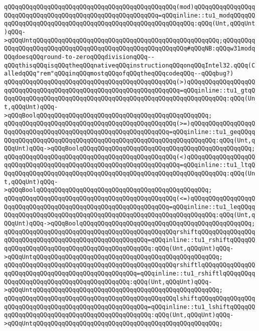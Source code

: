 \verb|qQQqqQQqqQQqqQQqqQQqqQQqqQQqqQQqqQQqqQQqqQQqqQQq(mod)qQQqqQQqqQQqqQQqqQQqqQQqqQQqqQQqqQQqqQQqqQQqqQQqqQQqqQQqqQQq=qQQqinline::tu1_modqQQqqQQqqQQqqQQqqQQqqQQqqQQqqQQqqQQqqQQqqQQqqQQqqQQqqQQqqQQq:qQQq(Unt,qQQqUnt)qQQq->qQQqUntqQQqqQQqqQQqqQQqqQQqqQQqqQQqqQQqqQQqqQQqqQQqqQQqqQQq;qQQqqQQqqQQqqQQqqQQqqQQqqQQqqQQqqQQqqQQqqQQqqQQqqQQqqQQqqQQq#qQQqNB:qQQqw31modqQQqdoesqQQqround-to-zeroqQQqdivisionqQQq--qQQqthisqQQqisqQQqtheqQQqnativeqQQqinstructionqQQqonqQQqIntel32.qQQq(CalledqQQq"rem"qQQqinqQQqmostqQQqofqQQqtheqQQqcodeqQQq--qQQqbug?)|\newline
\verb|qQQqqQQqqQQqqQQqqQQqqQQqqQQqqQQqqQQqqQQqqQQqqQQq(>)qQQqqQQqqQQqqQQqqQQqqQQqqQQqqQQqqQQqqQQqqQQqqQQqqQQqqQQqqQQqqQQqqQQq=qQQqinline::tu1_gtqQQqqQQqqQQqqQQqqQQqqQQqqQQqqQQqqQQqqQQqqQQqqQQqqQQqqQQqqQQqqQQq:qQQq(Unt,qQQqUnt)qQQq->qQQqBoolqQQqqQQqqQQqqQQqqQQqqQQqqQQqqQQqqQQqqQQqqQQqqQQq;|\newline
\verb|qQQqqQQqqQQqqQQqqQQqqQQqqQQqqQQqqQQqqQQqqQQqqQQq(>=)qQQqqQQqqQQqqQQqqQQqqQQqqQQqqQQqqQQqqQQqqQQqqQQqqQQqqQQqqQQqqQQq=qQQqinline::tu1_geqQQqqQQqqQQqqQQqqQQqqQQqqQQqqQQqqQQqqQQqqQQqqQQqqQQqqQQqqQQqqQQq:qQQq(Unt,qQQqUnt)qQQq->qQQqBoolqQQqqQQqqQQqqQQqqQQqqQQqqQQqqQQqqQQqqQQqqQQqqQQq;|\newline
\verb|qQQqqQQqqQQqqQQqqQQqqQQqqQQqqQQqqQQqqQQqqQQqqQQq(<)qQQqqQQqqQQqqQQqqQQqqQQqqQQqqQQqqQQqqQQqqQQqqQQqqQQqqQQqqQQqqQQqqQQq=qQQqinline::tu1_ltqQQqqQQqqQQqqQQqqQQqqQQqqQQqqQQqqQQqqQQqqQQqqQQqqQQqqQQqqQQqqQQq:qQQq(Unt,qQQqUnt)qQQq->qQQqBoolqQQqqQQqqQQqqQQqqQQqqQQqqQQqqQQqqQQqqQQqqQQqqQQq;|\newline
\verb|qQQqqQQqqQQqqQQqqQQqqQQqqQQqqQQqqQQqqQQqqQQqqQQq(<=)qQQqqQQqqQQqqQQqqQQqqQQqqQQqqQQqqQQqqQQqqQQqqQQqqQQqqQQqqQQqqQQq=qQQqinline::tu1_leqQQqqQQqqQQqqQQqqQQqqQQqqQQqqQQqqQQqqQQqqQQqqQQqqQQqqQQqqQQqqQQq:qQQq(Unt,qQQqUnt)qQQq->qQQqBoolqQQqqQQqqQQqqQQqqQQqqQQqqQQqqQQqqQQqqQQqqQQqqQQq;|\newline
\verb|qQQqqQQqqQQqqQQqqQQqqQQqqQQqqQQqqQQqqQQqqQQqqQQqrshiftqQQqqQQqqQQqqQQqqQQqqQQqqQQqqQQqqQQqqQQqqQQqqQQqqQQqqQQq=qQQqinline::tu1_rshiftqQQqqQQqqQQqqQQqqQQqqQQqqQQqqQQqqQQqqQQqqQQqqQQq:qQQq(Unt,qQQqUnt)qQQq->qQQqUntqQQqqQQqqQQqqQQqqQQqqQQqqQQqqQQqqQQqqQQqqQQqqQQqqQQq;|\newline
\verb|qQQqqQQqqQQqqQQqqQQqqQQqqQQqqQQqqQQqqQQqqQQqqQQqrshiftlqQQqqQQqqQQqqQQqqQQqqQQqqQQqqQQqqQQqqQQqqQQqqQQqqQQq=qQQqinline::tu1_rshiftlqQQqqQQqqQQqqQQqqQQqqQQqqQQqqQQqqQQqqQQqqQQq:qQQq(Unt,qQQqUnt)qQQq->qQQqUntqQQqqQQqqQQqqQQqqQQqqQQqqQQqqQQqqQQqqQQqqQQqqQQqqQQq;|\newline
\verb|qQQqqQQqqQQqqQQqqQQqqQQqqQQqqQQqqQQqqQQqqQQqqQQqlshiftqQQqqQQqqQQqqQQqqQQqqQQqqQQqqQQqqQQqqQQqqQQqqQQqqQQqqQQq=qQQqinline::tu1_lshiftqQQqqQQqqQQqqQQqqQQqqQQqqQQqqQQqqQQqqQQqqQQqqQQq:qQQq(Unt,qQQqUnt)qQQq->qQQqUntqQQqqQQqqQQqqQQqqQQqqQQqqQQqqQQqqQQqqQQqqQQqqQQqqQQq;|\newline
